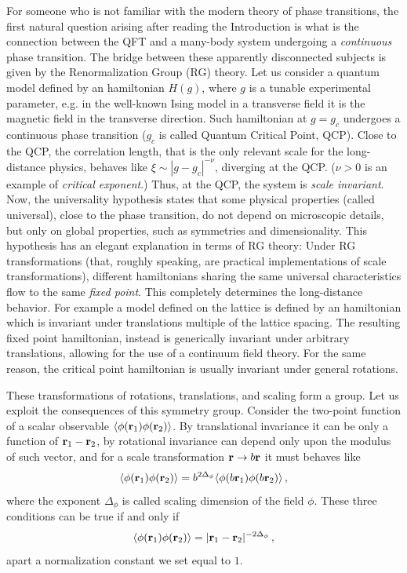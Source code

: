 \documentclass[12pt]{article}
\def\be{\begin{equation}}
\def\ee{\end{equation}}
\begin{document}
For someone who is not familiar with the modern theory of phase transitions,
the first natural question arising after reading the Introduction is 
what is the connection between the QFT and a 
many-body system undergoing a {\it continuous} phase transition. 
The bridge between these apparently disconnected subjects is given by
the Renormalization Group (RG) theory.\cite{cardybook}
Let us consider a quantum model defined by an hamiltonian $H(g)$, where
$g$ is a tunable experimental parameter, e.g. in the well-known Ising model
in a transverse field it is the magnetic field in the transverse 
direction.\cite{sach}
Such hamiltonian at $g=g_c$ undergoes a continuous phase transition 
($g_c$ is called Quantum Critical Point, QCP).
Close to the QCP, the correlation length, 
that is the only relevant scale for the long-distance physics, 
behaves like $\xi\sim |g-g_c|^{-\nu}$, diverging at the QCP. 
($\nu>0$ is an example of {\it critical exponent}.)
Thus, at the QCP, the system is {\it scale invariant}. 
Now, the universality hypothesis states that some physical properties (called
universal), close to the phase transition, do not depend on 
microscopic details, but only 
on global properties, such as symmetries and dimensionality.
This hypothesis has an elegant explanation in terms of RG theory:
Under RG transformations (that, roughly speaking, are practical 
implementations of scale transformations), 
different hamiltonians sharing the same universal 
characteristics flow to the same {\em fixed point}. 
This completely determines the long-distance behavior. 
For example a model defined on the lattice is
defined by an hamiltonian which is invariant under translations multiple of 
the lattice spacing. The resulting fixed point hamiltonian, instead is 
generically invariant under arbitrary translations, allowing for the use of 
a continuum field theory.
For the same reason, the critical point hamiltonian is usually invariant 
under general rotations.

These transformations of rotations, translations, and scaling form a 
group. Let us exploit the consequences of this symmetry group.
Consider the two-point function of a scalar observable 
$\langle \phi({\bf r}_1) \phi({\bf r}_2) \rangle$.
By translational invariance it can be only a function of 
${\bf r}_1- {\bf r}_2$, by rotational invariance can depend only upon
the modulus of such vector, and for a scale transformation 
${\bf r}\to b{\bf r}$ it must behaves like
\be
\langle \phi({\bf r}_1) \phi({\bf r}_2)\rangle=b^{2 \Delta_\phi}
\langle \phi(b {\bf r}_1) \phi(b{\bf r}_2)\rangle\,,
\label{scaltra}
\ee
where the exponent $\Delta_\phi$ is called scaling dimension of the field $\phi$.
These three conditions can be true if and only if
\be
\langle \phi({\bf r}_1) \phi({\bf r}_2)\rangle=
|{\bf r}_1-{\bf r}_2|^{-2 \Delta_\phi}\,,
\label{2ptsca}
\ee
apart a normalization constant we set equal to $1$.
\end{document}
